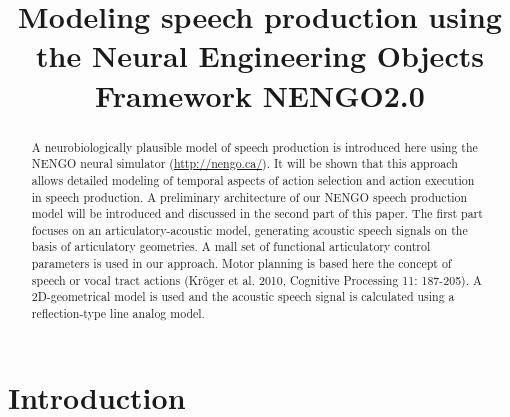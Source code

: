 \documentclass[conference]{IEEEtran}
\begin{document}
\title{Modeling speech production using the
  Neural Engineering Objects Framework NENGO2.0}

\author{
\and
{}
}

\maketitle

\begin{abstract}
  A neurobiologically plausible model of speech production is
  introduced here using the NENGO neural simulator
  (\url{http://nengo.ca/}). It will be shown that this approach allows
  detailed modeling of temporal aspects of action selection and action
  execution in speech production. A preliminary architecture of our
  NENGO speech production model will be introduced and discussed in
  the second part of this paper. The first part focuses on an
  articulatory-acoustic model, generating acoustic speech signals on
  the basis of articulatory geome­tries. A mall set of functional
  articulatory control parameters is used in our approach. Motor
  planning is based here the concept of speech or vocal tract actions
  (Kr\"{o}ger et al. 2010, Cognitive Processing 11: 187-205). A
  2D-geometrical model is used and the acoustic speech signal is
  calculated using a reflection-type line analog model.
\end{abstract}


\IEEEpeerreviewmaketitle

\section{Introduction}
\end{document}

